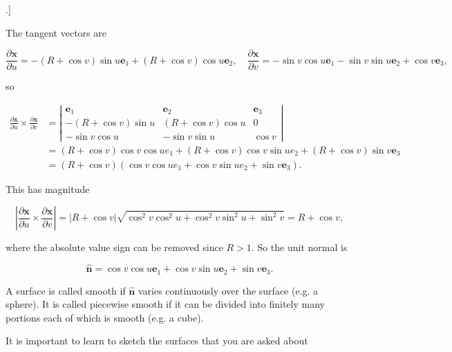 \begin{example}[
  Find the outward unit normal for the torus \(\boldsymbol{x}(u, v)=(R+\cos v) \cos u e_1+(R+\cos v) \sin u e_2+\sin v e_3\), where \(R>1\) and \(u, v \in[0,2 \pi]\).]

The tangent vectors are

\[
\frac{\partial \boldsymbol{x}}{\partial u}=-(R+\cos v) \sin u \boldsymbol{e}_1+(R+\cos v) \cos u \boldsymbol{e}_2, \quad \frac{\partial \boldsymbol{x}}{\partial v}=-\sin v \cos u \boldsymbol{e}_1-\sin v \sin u \boldsymbol{e}_2+\cos v \boldsymbol{e}_3,
\]

so

\[
\begin{aligned}
\frac{\partial \boldsymbol{x}}{\partial u} \times \frac{\partial \boldsymbol{x}}{\partial v} & =\left|\begin{array}{ccc}
\boldsymbol{e}_1 & \boldsymbol{e}_2 & \boldsymbol{e}_3 \\
-(R+\cos v) \sin u & (R+\cos v) \cos u & 0 \\
-\sin v \cos u & -\sin v \sin u & \cos v
\end{array}\right| \\
& =(R+\cos v) \cos v \cos u e_1+(R+\cos v) \cos v \sin u e_2+(R+\cos v) \sin v \boldsymbol{e}_3 \\
& =(R+\cos v)\left(\cos v \cos u e_1+\cos v \sin u e_2+\sin v \boldsymbol{e}_3\right) .
\end{aligned}
\]

This has magnitude

\[
\left|\frac{\partial \boldsymbol{x}}{\partial u} \times \frac{\partial \boldsymbol{x}}{\partial v}\right|=|R+\cos v| \sqrt{\cos ^2 v \cos ^2 u+\cos ^2 v \sin ^2 u+\sin ^2 v}=R+\cos v,
\]

where the absolute value sign can be removed since \(R>1\). So the unit normal is

\[
\hat{\boldsymbol{n}}=\cos v \cos u \boldsymbol{e}_1+\cos v \sin u \boldsymbol{e}_2+\sin v \boldsymbol{e}_3 .
\]
\end{example}

\begin{definition}
  A surface is called smooth if \(\hat{\boldsymbol{n}}\) varies continuously over the surface (e.g. a sphere). It is called piecewise smooth if it can be divided into finitely many portions each of which is smooth (e.g. a cube).
\end{definition}

\begin{remark}
  It is important to learn to sketch the surfaces that you are asked about
\end{remark}

